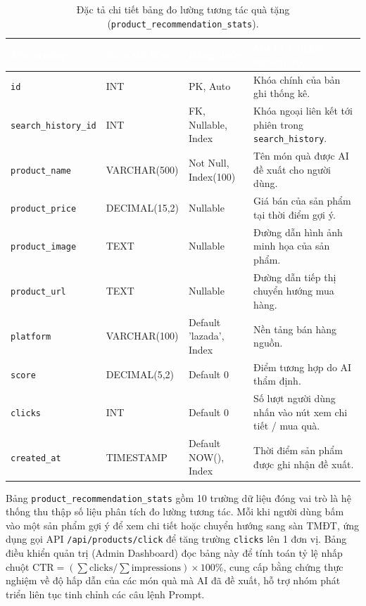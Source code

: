 \begin{table}[htbp]
\centering
\caption{Đặc tả chi tiết bảng đo lường tương tác quà tặng (\texttt{product\_recommendation\_stats}).}
\label{tab:db_stats}
\small
\renewcommand{\arraystretch}{1.25}
\begin{tabularx}{\textwidth}{|p{3.0cm}|p{2.6cm}|p{2.8cm}|X|}
\hline
\rowcolor{PrimaryBlue}
\textcolor{white}{\textbf{Tên trường}} &
\textcolor{white}{\textbf{Kiểu dữ liệu}} &
\textcolor{white}{\textbf{Ràng buộc}} &
\textcolor{white}{\textbf{Mô tả ý nghĩa nghiệp vụ}} \\
\hline
\texttt{id} & INT & PK, Auto & Khóa chính của bản ghi thống kê. \\
\hline
\texttt{search\_history\_id} & INT & FK, Nullable, Index & Khóa ngoại liên kết tới phiên trong \texttt{search\_history}. \\
\hline
\texttt{product\_name} & VARCHAR(500) & Not Null, Index(100) & Tên món quà được AI đề xuất cho người dùng. \\
\hline
\texttt{product\_price} & DECIMAL(15,2) & Nullable & Giá bán của sản phẩm tại thời điểm gợi ý. \\
\hline
\texttt{product\_image} & TEXT & Nullable & Đường dẫn hình ảnh minh họa của sản phẩm. \\
\hline
\texttt{product\_url} & TEXT & Nullable & Đường dẫn tiếp thị chuyển hướng mua hàng. \\
\hline
\texttt{platform} & VARCHAR(100) & Default 'lazada', Index & Nền tảng bán hàng nguồn. \\
\hline
\texttt{score} & DECIMAL(5,2) & Default 0 & Điểm tương hợp do AI thẩm định. \\
\hline
\texttt{clicks} & INT & Default 0 & Số lượt người dùng nhấn vào nút xem chi tiết / mua quà. \\
\hline
\texttt{created\_at} & TIMESTAMP & Default NOW(), Index & Thời điểm sản phẩm được ghi nhận đề xuất. \\
\hline
\end{tabularx}
\end{table}

Bảng \texttt{product\_recommendation\_stats} gồm 10 trường dữ liệu đóng vai trò là hệ thống thu thập số liệu phân tích đo lường tương tác. Mỗi khi người dùng bấm vào một sản phẩm gợi ý để xem chi tiết hoặc chuyển hướng sang sàn TMĐT, ứng dụng gọi API \texttt{/api/products/click} để tăng trường \texttt{clicks} lên 1 đơn vị. Bảng điều khiển quản trị (Admin Dashboard) đọc bảng này để tính toán tỷ lệ nhấp chuột $\mathrm{CTR} = (\sum \mathrm{clicks} / \sum \mathrm{impressions}) \times 100\%$, cung cấp bằng chứng thực nghiệm về độ hấp dẫn của các món quà mà AI đã đề xuất, hỗ trợ nhóm phát triển liên tục tinh chỉnh các câu lệnh Prompt.

